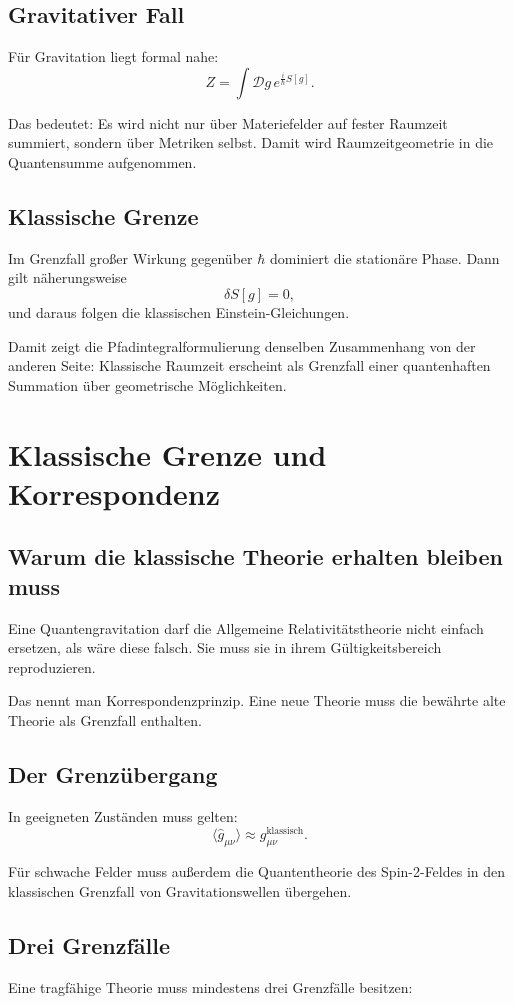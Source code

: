 \documentclass[11pt,a4paper,oneside]{book}
\theoremstyle{definition}
\theoremstyle{plain}
\theoremstyle{remark}
\begin{document}
\section{Gravitativer Fall}
Für Gravitation liegt formal nahe:
\[
Z=\int \mathcal{D}g\,e^{\frac{i}{\hbar}S[g]}.
\]

Das bedeutet: Es wird nicht nur über Materiefelder auf fester Raumzeit summiert, sondern über Metriken selbst. Damit wird Raumzeitgeometrie in die Quantensumme aufgenommen.

\section{Klassische Grenze}
Im Grenzfall großer Wirkung gegenüber $\hbar$ dominiert die stationäre Phase. Dann gilt näherungsweise
\[
\delta S[g]=0,
\]
und daraus folgen die klassischen Einstein-Gleichungen.

Damit zeigt die Pfadintegralformulierung denselben Zusammenhang von der anderen Seite: Klassische Raumzeit erscheint als Grenzfall einer quantenhaften Summation über geometrische Möglichkeiten.

\chapter{Klassische Grenze und Korrespondenz}
\section{Warum die klassische Theorie erhalten bleiben muss}
Eine Quantengravitation darf die Allgemeine Relativitätstheorie nicht einfach ersetzen, als wäre diese falsch. Sie muss sie in ihrem Gültigkeitsbereich reproduzieren.

Das nennt man Korrespondenzprinzip. Eine neue Theorie muss die bewährte alte Theorie als Grenzfall enthalten.

\section{Der Grenzübergang}
In geeigneten Zuständen muss gelten:
\[
\langle \hat g_{\mu\nu}\rangle \approx g_{\mu\nu}^{\text{klassisch}}.
\]

Für schwache Felder muss außerdem die Quantentheorie des Spin-2-Feldes in den klassischen Grenzfall von Gravitationswellen übergehen.

\section{Drei Grenzfälle}
Eine tragfähige Theorie muss mindestens drei Grenzfälle besitzen:
\end{document}
